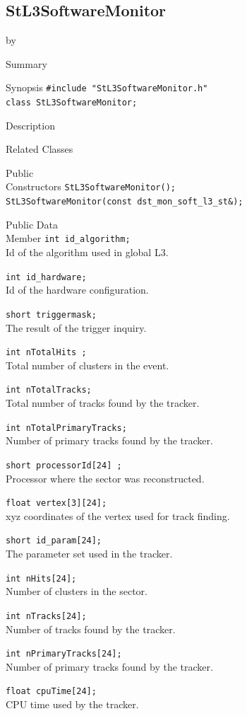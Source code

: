 \documentclass[twoside]{article}
\newcommand{\entrylabel}[1]{\mbox{\textbf{{#1}}}\hfil}%
\newenvironment{entry}
{\begin{list}{}%
    {\renewcommand{\makelabel}{\entrylabel}%
     \setlength{\labelwidth}{90pt}%
     \setlength{\leftmargin}{\labelwidth}
     \advance\leftmargin by \labelsep%
      }%
    }%
  {\end{list}}
\newcommand{\Entrylabel}[1]%
{\raisebox{0pt}[1ex][0pt]{\makebox[\labelwidth][l]%
    {\parbox[t]{\labelwidth}{\hspace{0pt}\textbf{{#1}}}}}}
\newenvironment{Entry}%
{\renewcommand{\entrylabel}{\Entrylabel}\begin{entry}}%
  {\end{entry}}
\begin{document}
\subsection{StL3SoftwareMonitor}
\label{sec:StL3SoftwareMonitor}
\begin{Entry}
\item[Summary]
\item[Synopsis]
    \verb+#include "StL3SoftwareMonitor.h"+\\
    \verb+class StL3SoftwareMonitor;+\\
\item[Description]
\item[Related Classes]
\item[Public\\ Constructors]
    \verb+StL3SoftwareMonitor();+\\
    \verb+StL3SoftwareMonitor(const dst_mon_soft_l3_st&);+\\
\item[Public Data\\ Member]
    \verb+int id_algorithm;+\\
    Id of the algorithm used in global L3.
    
    \verb+int id_hardware;+\\
    Id of the hardware configuration.
    
    \verb+short triggermask;+\\
    The result of the trigger inquiry.
    
    \verb+int nTotalHits ;+\\
    Total number of clusters in the event.
    
    \verb+int nTotalTracks;+\\
    Total number of tracks found by the tracker.
    
    \verb+int nTotalPrimaryTracks;+\\
    Number of primary tracks found by the tracker.
    
    \verb+short processorId[24] ;+\\
    Processor where the sector was reconstructed.
    
    \verb+float vertex[3][24];+\\
    xyz coordinates of the vertex used for track finding.
    
    \verb+short id_param[24];+\\
    The parameter set used in the tracker.
    
    \verb+int nHits[24];+\\
    Number of clusters in the sector.
    
    \verb+int nTracks[24];+\\
    Number of tracks found by the tracker.
    
    \verb+int nPrimaryTracks[24];+\\
    Number of primary tracks found by the tracker.
    
    \verb+float cpuTime[24];+\\
    CPU time used by the tracker.
\end{Entry}
\clearpage
\end{document}
